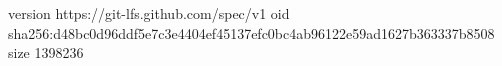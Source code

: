 version https://git-lfs.github.com/spec/v1
oid sha256:d48bc0d96ddf5e7c3e4404ef45137efc0bc4ab96122e59ad1627b363337b8508
size 1398236
